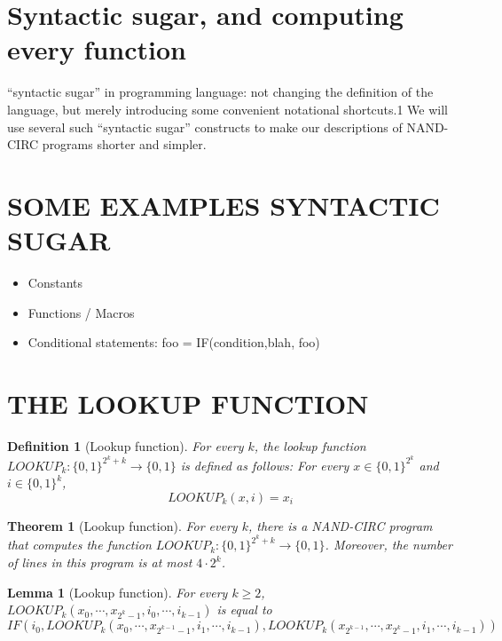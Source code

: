 \documentclass[aps,pra,onecolumn,notitlepage,superscriptaddress]{revtex4-1}
\newtheorem{theo}{Theorem}
\newtheorem{lemma}{Lemma}
\newtheorem{defi}{Definition}
\begin{document}
    \section{Syntactic sugar, and computing every function}
    ``syntactic sugar'' in programming language: not changing the definition of the language, but merely introducing some convenient notational shortcuts.1 We will use several such ``syntactic sugar'' constructs to make our descriptions of NAND-CIRC programs shorter and simpler.

    \section{SOME EXAMPLES SYNTACTIC SUGAR}
    \begin{itemize}
        \item Constants
        \item Functions / Macros
        \item Conditional statements: foo = IF(condition,blah, foo)
    \end{itemize}
    
    \section{THE LOOKUP FUNCTION}
    \begin{defi} [Lookup function]
        For every $k$, the lookup function $LOOKUP_k: \{0, 1\}^{2^k + k} \rightarrow \{0, 1\}$ is defined as follows: For every $x \in \{0, 1\}^{2^k}$ and $i \in \{0, 1\}^𝑘$,
        \begin{equation}
            LOOKUP_k(x,i) = x_i
        \end{equation}
    \end{defi}

    \begin{theo} [Lookup function]
        For every $k$, there is a NAND-CIRC program that computes the function $LOOKUP_k: \{0, 1\}^{2^k+k} \rightarrow \{0, 1\}$. Moreover, the number of lines in this program is at most $4 \cdot 2^k$.
    \end{theo}

    \begin{lemma} [Lookup function]
        For every $k \geq 2$, $LOOKUP_k(x_0, \cdots, x_{2^k-1}, i_0, \cdots, i_{k-1})$ is equal to
        \begin{equation}
            IF(i_0, LOOKUP_k(x_0, \cdots, x_{2^{k-1}-1}, i_1, \cdots, i_{k-1}), LOOKUP_k(x_{2^{k-1}}, \cdots, x_{2^k-1}, i_1, \cdots, i_{k-1}))
        \end{equation}
    \end{lemma}
\end{document}
